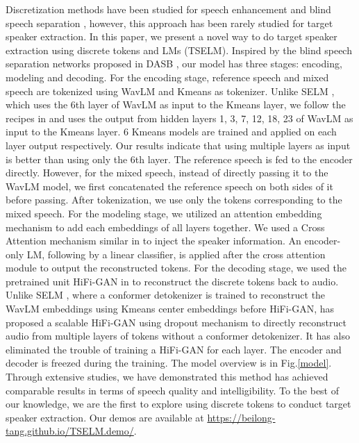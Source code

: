 \documentclass[conference]{IEEEtran}
\begin{document}
Discretization methods have been studied for speech 
enhancement \cite{selm} and blind speech separation \cite{dasb,tokensplit}, 
however, this approach has 
been rarely studied for target speaker extraction. In this paper, we present a novel way to do 
target speaker extraction using discrete tokens and LMs (TSELM). Inspired by the blind speech separation 
networks proposed in DASB \cite{dasb}, our model has three stages: encoding, modeling and decoding.
For the encoding stage, reference speech and mixed speech are tokenized using WavLM and 
Kmeans as tokenizer. Unlike SELM \cite{selm}, which uses the 6th layer of WavLM as input to the Kmeans layer, 
we follow the recipes in \cite{dasb} and uses the output from hidden 
layers 1, 3, 7, 12, 18, 23 of WavLM as input to the Kmeans layer. 6 Kmeans models
are trained and applied on each layer output respectively. 
Our results indicate that using multiple layers as 
input is better 
than using only the 6th layer. The reference speech is fed to the encoder directly. 
However, for the mixed speech, instead of directly passing it to the WavLM model, we first concatenated the reference speech on both sides 
of it before passing. After tokenization, we use only the tokens 
corresponding to the mixed speech. For the modeling stage, we utilized an attention 
embedding mechanism to add each embeddings of all layers together. We used a Cross 
Attention mechanism similar in \cite{sef_net} to inject the speaker information. 
An encoder-only LM, following by a linear classifier, is applied after the cross attention module
to output the reconstructed tokens. 
For the decoding stage, we used the pretrained unit HiFi-GAN 
in \cite{unit_hifi} to reconstruct the 
discrete tokens back to audio. Unlike SELM \cite{selm}, where a conformer 
detokenizer is trained 
to reconstruct the WavLM embeddings using Kmeans center embeddings before HiFi-GAN, \cite{unit_hifi} has proposed a scalable HiFi-GAN using dropout mechanism to directly 
reconstruct audio from multiple layers of tokens without a conformer detokenizer. It 
has also eliminated the trouble of training a HiFi-GAN for each layer. The encoder and 
decoder is freezed during the training. The model overview is in Fig.\ref{model}. 
Through extensive studies, we have demonstrated this method has achieved comparable results in terms 
of speech quality and intelligibility. To the best of our knowledge, we are the first to explore 
using discrete tokens to conduct target speaker extraction. Our demos are available at \href{https://beilong-tang.github.io/TSELM.demo/}{https://beilong-tang.github.io/TSELM.demo/}.
\end{document}
